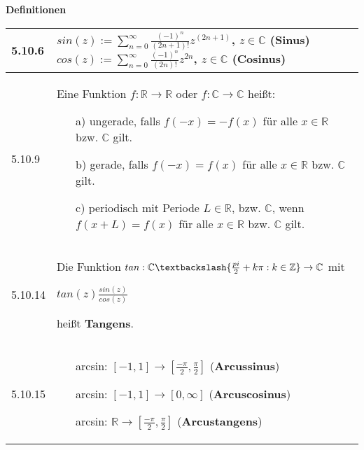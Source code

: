     \noindent
    \textbf{Definitionen}
    \begin{table}[H]  
    \begin{tabularx}{\textwidth}{X m{16cm}}
        \toprule

        5.10.6& $sin(z) := \sum^{\infty}_{n=0} \frac{(-1)^n}{(2n+1)!} z^(2n+1)$, $z \in \mathbb{C}$ (\textbf{Sinus}) \hfill \break
                $cos(z) := \sum^{\infty}_{n=0} \frac{(-1)^n}{(2n)!}z^{2n}$, $z \in \mathbb{C}$ (\textbf{Cosinus}) \\
        \midrule
        5.10.9& Eine Funktion $f: \mathbb{R} \rightarrow \mathbb{R}$ oder $f: \mathbb{C} \rightarrow \mathbb{C}$ heißt: 
                \begin{itemize}[topsep=-0.5cm]
                    \item[a)] ungerade, falls $f(-x) = -f(x)$ für alle $x \in \mathbb{R}$ bzw. $\mathbb{C}$ gilt.
                    \item[b)] gerade, falls $f(-x) = f(x)$ für alle $x \in \mathbb{R}$ bzw. $\mathbb{C}$ gilt.
                    \item[c)] periodisch mit Periode $L \in \mathbb{R}$, bzw. $\mathbb{C}$, wenn $f(x+L) = f(x)$ für alle $x \in \mathbb{R}$ bzw. $\mathbb{C}$ gilt.
                \end{itemize} \vspace{-0cm}\\
        \midrule
        5.10.14&Die Funktion $tan: \mathbb{C} \textbackslash \{\frac{pi}{2}+k\pi:k \in \mathbb{Z}\} \rightarrow \mathbb{C}$ mit \hfill \break
                \centerline{$tan(z) \frac{sin(z)}{cos(z)}$}
                heißt \textbf{Tangens}. \\
        \midrule
        5.10.15&\begin{itemize}[topsep=-0.5cm]
                    \item[] arcsin: $[-1,1] \rightarrow [\frac{-\pi}{2},\frac{\pi}{2}]$ (\textbf{Arcussinus})
                    \item[] arcsin: $[-1,1] \rightarrow [0, \infty]$ (\textbf{Arcuscosinus})
                    \item[] arcsin: $\mathbb{R} \rightarrow [\frac{-\pi}{2},\frac{\pi}{2}]$ (\textbf{Arcustangens})
                \end{itemize} \vspace{-0cm} \\

        \bottomrule

    \end{tabularx}
    \end{table}

